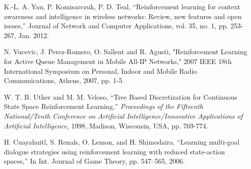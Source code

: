 \documentclass[journal]{IEEEtran}
\begin{document}
\begin{thebibliography}{1}
K.-L. A. Yau, P. Komisarczuk, P. D. Teal, ``Reinforcement learning for context awareness and intelligence in wireless
networks: Review, new features and open issues,'' Journal of Network and Computer Applications, vol. 35, no. 1, pp. 253-267, Jan. 2012.

N. Vucevic, J. Perez-Romero, O. Sallent and R. Agusti, "Reinforcement Learning for Active Queue Management in Mobile All-IP Networks," 2007 IEEE 18th International Symposium on Personal, Indoor and Mobile Radio Communications, Athens, 2007, pp. 1-5.

W. T. B. Uther and M. M. Veloso, ``Tree Based Discretization for Continuous State Space Reinforcement Learning,'' \emph{Proceedings of the Fifteenth National/Tenth Conference on Artificial Intelligence/Innovative Applications of Artificial Intelligence,} 1998, Madison, Wisconsin, USA, pp. 769-774.

H. Cuayahuitl, S. Renals, O. Lemon, and H. Shimodaira. ``Learning multi-goal dialogue strategies using reinforcement learning with reduced state-action spaces,'' In Int. Journal of Game Theory, pp. 547–565, 2006.
\end{thebibliography}


\end{document}

